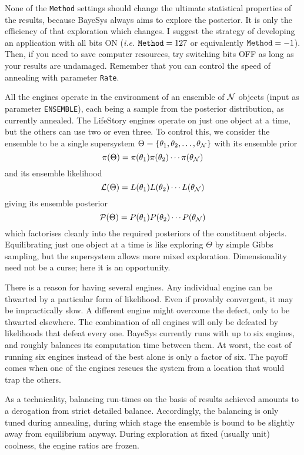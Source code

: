 None of the {\tt Method} settings should change the ultimate statistical properties of the results, because BayeSys always aims to explore the posterior.
It is only the efficiency of that exploration which changes.
I suggest the strategy of developing an application with all bits ON ({\it i.e.} ${\tt Method} = 127$ or equivalently ${\tt Method} = -1$).
Then, if you need to save computer resources, try switching bits OFF as long as your results are undamaged.
Remember that you can control the speed of annealing with parameter {\tt Rate}.

All the engines operate in the environment of an ensemble of $\cal N$ objects (input as parameter {\tt ENSEMBLE}),
each being a sample from the posterior distribution, as currently annealed.
The LifeStory engines operate on just one object at a time, but the others can use two or even three.
To control this, we consider the ensemble to be a single super\-system
$\Theta = \{ \theta_1, \theta_2, \ldots, \theta_{\cal N} \}$
with its ensemble prior
$$
  \pi(\Theta) = \pi(\theta_1) \pi(\theta_2) \cdots \pi(\theta_{\cal N})
$$
and its ensemble likelihood
$$
  {\cal L}(\Theta) = L(\theta_1) L(\theta_2) \cdots L(\theta_{\cal N})
$$
giving its ensemble posterior
$$
  {\cal P}(\Theta) = P(\theta_1) P(\theta_2) \cdots P(\theta_{\cal N})
$$
which factorises cleanly into the required posteriors of the constituent objects.
Equilibrating just one object at a time is like exploring $\Theta$ by simple Gibbs sampling, but the supersystem allows more mixed exploration.
Dimensionality need not be a curse; here it is an opportunity.

There is a reason for having several engines.
Any individual engine can be thwarted by a particular form of likelihood.
Even if provably convergent, it may be impractically slow.
A different engine might overcome the defect, only to be thwarted elsewhere.
The combination of all engines will only be defeated by likelihoods that defeat every one.
BayeSys currently runs with up to six engines, and roughly balances its computation time between them.
At worst, the cost of running six engines instead of the best alone is only a factor of six.
The payoff comes when one of the engines rescues the system from a location that would trap the others.

As a technicality, balancing run-times on the basis of results achieved amounts to a derogation from strict detailed balance.
Accordingly, the balancing is only tuned during annealing, during which stage the ensemble is bound to be slightly away from equilibrium anyway.
During exploration at fixed (usually unit) coolness, the engine ratios are frozen.

